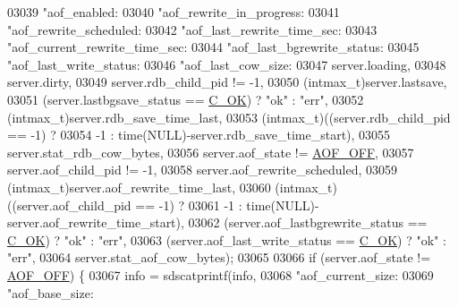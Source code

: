 \begin{DoxyCode}
{{{{{{{{{{{{{{{{{{{{{{{{{{{{{{{{{{{{{{{{{{{{{{{{{{{{{{{{{{{{{{{{{{{{{{{{{{{{{{{{{{{{{{{{{{{{{{03039             \textcolor{stringliteral}{"aof\_enabled:%
03040             \textcolor{stringliteral}{"aof\_rewrite\_in\_progress:%
03041             \textcolor{stringliteral}{"aof\_rewrite\_scheduled:%
03042             \textcolor{stringliteral}{"aof\_last\_rewrite\_time\_sec:%
03043             \textcolor{stringliteral}{"aof\_current\_rewrite\_time\_sec:%
03044             \textcolor{stringliteral}{"aof\_last\_bgrewrite\_status:%
03045             \textcolor{stringliteral}{"aof\_last\_write\_status:%
03046             \textcolor{stringliteral}{"aof\_last\_cow\_size:%
03047             server.loading,
03048             server.dirty,
03049             server.rdb\_child\_pid != -1,
03050             (intmax\_t)server.lastsave,
03051             (server.lastbgsave\_status == \hyperlink{server_8h_a303769ef1065076e68731584e758d3e1}{C\_OK}) ? \textcolor{stringliteral}{"ok"} : \textcolor{stringliteral}{"err"},
03052             (intmax\_t)server.rdb\_save\_time\_last,
03053             (intmax\_t)((server.rdb\_child\_pid == -1) ?
03054                 -1 : time(NULL)-server.rdb\_save\_time\_start),
03055             server.stat\_rdb\_cow\_bytes,
03056             server.aof\_state != \hyperlink{server_8h_a5226306fbcebcb6d5d02e0fef3c213c2}{AOF\_OFF},
03057             server.aof\_child\_pid != -1,
03058             server.aof\_rewrite\_scheduled,
03059             (intmax\_t)server.aof\_rewrite\_time\_last,
03060             (intmax\_t)((server.aof\_child\_pid == -1) ?
03061                 -1 : time(NULL)-server.aof\_rewrite\_time\_start),
03062             (server.aof\_lastbgrewrite\_status == \hyperlink{server_8h_a303769ef1065076e68731584e758d3e1}{C\_OK}) ? \textcolor{stringliteral}{"ok"} : \textcolor{stringliteral}{"err"},
03063             (server.aof\_last\_write\_status == \hyperlink{server_8h_a303769ef1065076e68731584e758d3e1}{C\_OK}) ? \textcolor{stringliteral}{"ok"} : \textcolor{stringliteral}{"err"},
03064             server.stat\_aof\_cow\_bytes);
03065 
03066         \textcolor{keywordflow}{if} (server.aof\_state != \hyperlink{server_8h_a5226306fbcebcb6d5d02e0fef3c213c2}{AOF\_OFF}) \{
03067             info = sdscatprintf(info,
03068                 \textcolor{stringliteral}{"aof\_current\_size:%
03069                 \textcolor{stringliteral}{"aof\_base\_size:%
}}}}}}}}}}}}}}}}}}}}}}}}}}}}}}}}}}}}}}}}}}}}}}}}}}}}}}}}}}}}}}}}}}}}}}}}}}}}}}}}}}}}}}}}}}}}}}}}}}}}}}}}
\end{DoxyCode}

